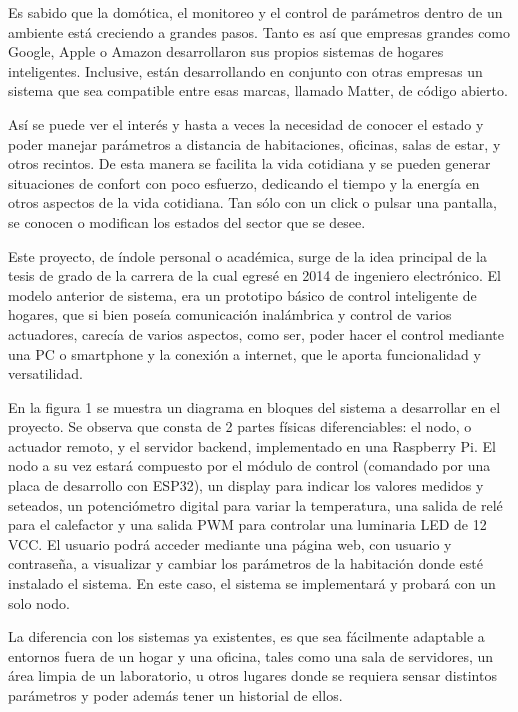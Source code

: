 \documentclass[
11pt, %
]{charter}
\begin{document}
Es sabido que la domótica, el monitoreo y el control de parámetros dentro de un ambiente está creciendo a grandes pasos. Tanto es así que empresas grandes como Google, Apple o Amazon desarrollaron sus propios sistemas de hogares inteligentes. Inclusive, están desarrollando en conjunto con otras empresas un sistema que sea compatible entre esas marcas, llamado Matter, de código abierto.

Así se puede ver el interés y hasta a veces la necesidad de conocer el estado y poder manejar parámetros a distancia de habitaciones, oficinas, salas de estar, y otros recintos. De esta manera se facilita la vida cotidiana y se pueden generar situaciones de confort con poco esfuerzo, dedicando el tiempo y la energía en otros aspectos de la vida cotidiana. Tan sólo con un click o pulsar una pantalla, se conocen o modifican los estados del sector que se desee.

Este proyecto, de índole personal o académica, surge de la idea principal de la tesis de grado de la carrera de la cual egresé en 2014 de ingeniero electrónico. El modelo anterior de sistema, era un prototipo básico de control inteligente de hogares, que si bien poseía comunicación inalámbrica y control de varios actuadores, carecía de varios aspectos, como ser, poder hacer el control mediante una PC o smartphone y la conexión a internet, que le aporta funcionalidad y versatilidad.

En la figura 1 se muestra un diagrama en bloques del sistema a desarrollar en el proyecto. Se observa que consta de 2 partes físicas diferenciables: el nodo, o actuador remoto, y el servidor backend, implementado en una Raspberry Pi. El nodo a su vez estará compuesto por el módulo de control (comandado por una placa de desarrollo con ESP32), un display para indicar los valores medidos y seteados, un potenciómetro digital para variar la temperatura, una salida de relé para el calefactor y una salida PWM para controlar una luminaria LED de 12 VCC. El usuario podrá acceder mediante una página web, con usuario y contraseña, a visualizar y cambiar los parámetros de la habitación donde esté instalado el sistema. En este caso, el sistema se implementará y probará con un solo nodo.

La diferencia con los sistemas ya existentes, es que sea fácilmente adaptable a entornos fuera de un hogar y una oficina, tales como una sala de servidores, un área limpia de un laboratorio, u otros lugares donde se requiera sensar distintos parámetros y poder además tener un historial de ellos.
\end{document}

